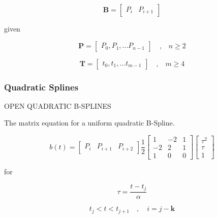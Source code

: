 \documentclass{article}
\begin{document}
    \begin{equation}
        \textbf{B} = \begin{bmatrix} P_{i} & P_{i+1}\end{bmatrix}
    \end{equation}
    
    given
    
    \begin{equation}
    \textbf{P} = \begin{bmatrix} P_0, P_1, ... P_{n-1} \end{bmatrix} \quad \text{,} \quad n \geq 2
    \end{equation}
    
    \begin{equation}
        \textbf{T} = \begin{bmatrix} t_0, t_1, ... t_{m-1} \end{bmatrix} \quad \text{,} \quad m \geq 4
    \end{equation}

\subsubsection{Quadratic Splines}
   
OPEN QUADRATIC B-SPLINES
\hfill \break

    The matrix equation for a uniform quadratic B-Spline.
    
    \begin{equation}
        b(t) = \begin{bmatrix} P_i & P_{i+1} & P_{i+2} \end{bmatrix} \frac{1}{2} \begin{bmatrix} 1 & -2 & 1 \\ -2 & 2 & 1 \\ 1 & 0 & 0
        \end{bmatrix} \begin{bmatrix} \tau^2 \\ \tau \\ 1 \end{bmatrix}
    \end{equation}
    
    for
    
    \begin{equation}
        \tau = \frac{t-t_j}{\alpha}
    \end{equation}
    
    \begin{equation}
        t_j < t < t_{j+1} \quad , \quad i = j-\textbf{k}
    \end{equation}
    
\end{document}
